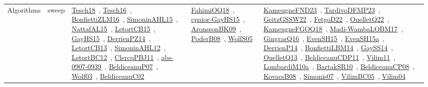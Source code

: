 {\begin{longtable}{lp{3cm}>{\raggedright\arraybackslash}p{6cm}>{\raggedright\arraybackslash}p{6cm}>{\raggedright\arraybackslash}p{8cm}}
Algorithms & sweep & \href{papers/Tesch18.pdf}{Tesch18}~\cite{Tesch18}, \href{papers/Tesch16.pdf}{Tesch16}~\cite{Tesch16}, \href{papers/BonfiettiZLM16.pdf}{BonfiettiZLM16}~\cite{BonfiettiZLM16}, \href{articles/SimoninAHL15.pdf}{SimoninAHL15}~\cite{SimoninAHL15}, \href{articles/NattafAL15.pdf}{NattafAL15}~\cite{NattafAL15}, \href{articles/LetortCB15.pdf}{LetortCB15}~\cite{LetortCB15}, \href{papers/GayHS15.pdf}{GayHS15}~\cite{GayHS15}, \href{papers/DerrienPZ14.pdf}{DerrienPZ14}~\cite{DerrienPZ14}, \href{papers/LetortCB13.pdf}{LetortCB13}~\cite{LetortCB13}, \href{papers/SimoninAHL12.pdf}{SimoninAHL12}~\cite{SimoninAHL12}, \href{papers/LetortBC12.pdf}{LetortBC12}~\cite{LetortBC12}, \href{papers/ClercqPBJ11.pdf}{ClercqPBJ11}~\cite{ClercqPBJ11}, \href{articles/abs-0907-0939.pdf}{abs-0907-0939}~\cite{abs-0907-0939}, \href{papers/BeldiceanuP07.pdf}{BeldiceanuP07}~\cite{BeldiceanuP07}, \href{papers/Wolf03.pdf}{Wolf03}~\cite{Wolf03}, \href{papers/BeldiceanuC02.pdf}{BeldiceanuC02}~\cite{BeldiceanuC02} & \href{articles/FahimiOQ18.pdf}{FahimiOQ18}~\cite{FahimiOQ18}, \href{papers/cpaior-GayHS15.pdf}{cpaior-GayHS15}~\cite{cpaior-GayHS15}, \href{papers/AronssonBK09.pdf}{AronssonBK09}~\cite{AronssonBK09}, \href{papers/PoderB08.pdf}{PoderB08}~\cite{PoderB08}, \href{papers/WolfS05.pdf}{WolfS05}~\cite{WolfS05} & \href{papers/KameugneFND23.pdf}{KameugneFND23}~\cite{KameugneFND23}, \href{papers/TardivoDFMP23.pdf}{TardivoDFMP23}~\cite{TardivoDFMP23}, \href{papers/GeitzGSSW22.pdf}{GeitzGSSW22}~\cite{GeitzGSSW22}, \href{articles/FetgoD22.pdf}{FetgoD22}~\cite{FetgoD22}, \href{papers/OuelletQ22.pdf}{OuelletQ22}~\cite{OuelletQ22}, \href{papers/KameugneFGOQ18.pdf}{KameugneFGOQ18}~\cite{KameugneFGOQ18}, \href{papers/Madi-WambaLOBM17.pdf}{Madi-WambaLOBM17}~\cite{Madi-WambaLOBM17}, \href{papers/GingrasQ16.pdf}{GingrasQ16}~\cite{GingrasQ16}, \href{papers/EvenSH15.pdf}{EvenSH15}~\cite{EvenSH15}, \href{articles/EvenSH15a.pdf}{EvenSH15a}~\cite{EvenSH15a}, \href{papers/DerrienP14.pdf}{DerrienP14}~\cite{DerrienP14}, \href{articles/BonfiettiLBM14.pdf}{BonfiettiLBM14}~\cite{BonfiettiLBM14}, \href{papers/GaySS14.pdf}{GaySS14}~\cite{GaySS14}, \href{papers/OuelletQ13.pdf}{OuelletQ13}~\cite{OuelletQ13}, \href{articles/BeldiceanuCDP11.pdf}{BeldiceanuCDP11}~\cite{BeldiceanuCDP11}, \href{papers/Vilim11.pdf}{Vilim11}~\cite{Vilim11}, \href{articles/LombardiM10a.pdf}{LombardiM10a}~\cite{LombardiM10a}, \href{articles/BartakSR10.pdf}{BartakSR10}~\cite{BartakSR10}, \href{papers/BeldiceanuCP08.pdf}{BeldiceanuCP08}~\cite{BeldiceanuCP08}, \href{articles/KovacsB08.pdf}{KovacsB08}~\cite{KovacsB08}, \href{articles/Simonis07.pdf}{Simonis07}~\cite{Simonis07}, \href{articles/VilimBC05.pdf}{VilimBC05}~\cite{VilimBC05}, \href{papers/Vilim04.pdf}{Vilim04}~\cite{Vilim04}\\

\end{longtable}}
